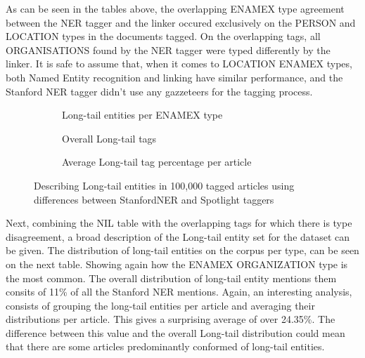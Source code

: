 As can be seen in the tables above, the overlapping ENAMEX type agreement between the NER tagger and the linker occured exclusively on
the PERSON and LOCATION types in the documents tagged.
On the overlapping tags, all ORGANISATIONS found by the NER tagger were typed differently by the linker.
It is safe to assume that, when it comes to LOCATION ENAMEX types, both Named Entity recognition and linking have similar performance,
and the Stanford NER tagger didn't use any gazzeteers\cite{stanfordfaq} for the tagging process.

\begin{figure}
    \centering
    \begin{subfigure}
        \label{fig:longtailpertype}
        \centering
        \caption{Long-tail entities per ENAMEX type}
    \end{subfigure}%
    \begin{subfigure}
        \label{fig:longtail}
        \centering
        \caption{Overall Long-tail tags}
    \end{subfigure}%
    \begin{subfigure}
        \label{fig:avglongtailpercentperarticle}
        \centering
        \caption{Average Long-tail tag percentage per article}
    \end{subfigure}%
    \caption{Describing Long-tail entities in 100,000 tagged articles using differences between StanfordNER and Spotlight taggers}
\end{figure}

Next, combining the NIL table with the overlapping tags for which there is type disagreement, a broad description of the Long-tail entity set for the dataset can be given.
The distribution of long-tail entities on the corpus per type, can be seen on the next table.
Showing again how the ENAMEX ORGANIZATION type is the most common.
The overall distribution of long-tail entity mentions them consits of 11\% of all the Stanford NER mentions.
Again, an interesting analysis, consists of grouping the long-tail entities per article and averaging their distributions per article.
This gives a surprising average of over 24.35\%.
The difference between this value and the overall Long-tail distribution could mean that there are some articles predominantly conformed of long-tail entities.


